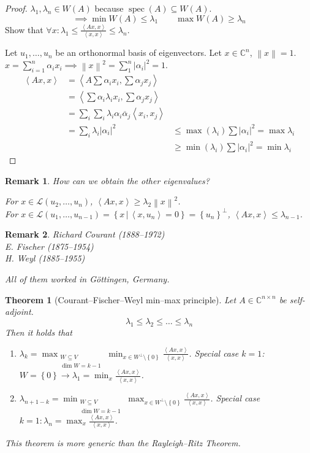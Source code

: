 \documentclass{article}
\newtheorem{theorem}{Theorem}  \numberwithin{theorem}{section}
\newtheorem{remark}{Remark}  \numberwithin{remark}{section}
\newcommand{\set}[1]{\left\{#1\right\}}
\newcommand{\setdef}[2]{\left\{\left.#1\,\right|\,#2\right\}}
\newcommand{\angel}[1]{\left\langle#1\right\rangle}
\newcommand{\norm}[1]{\left\|#1\right\|}
\newcommand{\card}[1]{\left|#1\right|}
\begin{document}
\begin{proof}
  $\lambda_1, \lambda_n \in W(A)$ because $\operatorname{spec}(A) \subseteq W(A)$.
  \[ \implies \min{W(A)} \leq \lambda_1 \qquad \max{W(A)} \geq \lambda_n \]
  Show that $\forall x: \lambda_1 \leq \frac{\angel{Ax, x}}{\angel{x, x}} \leq \lambda_n$.

  Let $u_1, \dots, u_n$ be an orthonormal basis of eigenvectors.
  Let $x \in \mathbb C^n$, $\norm{x} = 1$. $x = \sum_{i=1}^n \alpha_i x_i \implies \norm{x}^2 = \sum_{1}^n \card{\alpha_i}^2 = 1$.
  \begin{align*}
    \angel{Ax, x} &= \angel{A \sum \alpha_i x_i, \sum \alpha_j x_j} \\
      &= \angel{\sum \alpha_i \lambda_i x_i, \sum \alpha_j x_j} \\
      &= \sum_{i} \sum_{i} \lambda_i \alpha_i \overline{\alpha}_j \angel{x_i, x_j} \\
      &= \sum_{i} \lambda_i \card{\alpha_i}^2
      &\leq \max(\lambda_i) \sum \card{\alpha_i}^2 = \max{\lambda_i} \\
      & &\geq \min(\lambda_i) \sum \card{\alpha_i}^2 = \min{\lambda_i}
  \end{align*}
\end{proof}

\begin{remark} %
  How can we obtain the other eigenvalues?

  For $x \in \mathcal L(u_2, \dots, u_n)$, $\angel{Ax, x} \geq \lambda_2 \norm{x}^2$. \\
  For $x \in \mathcal L(u_1, \dots, u_{n-1}) = \setdef{x}{\angel{x, u_n} = 0} = \set{u_n}^\bot$, $\angel{Ax, x} \leq \lambda_{n-1}$.
\end{remark}

\begin{remark}
  Richard Courant (1888--1972) \\
  E. Fischer (1875--1954) \\
  H. Weyl (1885--1955)

  All of them worked in G\"ottingen, Germany.
\end{remark}

\begin{theorem}[Courant--Fischer--Weyl min--max principle] %
  \label{cfw-mm}
  Let $A \in \mathbb C^{n \times n}$ be self-adjoint.
  \[ \lambda_1 \leq \lambda_2 \leq \dots \leq \lambda_n \]
  Then it holds that
  \begin{enumerate}
    \item $\lambda_k = \max_{\substack{W \subseteq V \\ \dim{W} = k - 1}} \min_{x \in W^\bot \setminus \set{0}} \frac{\angel{Ax, x}}{\angel{x, x}}$. Special case $k = 1$: $W = \set{0} \to \lambda_1 = \min_x \frac{\angel{Ax, x}}{\angel{x, x}}$.
    \item $\lambda_{n+1 - k} = \min_{\substack{W \subseteq V \\ \dim{W} = k-1}} \max_{x \in W^\bot \setminus \set{0}} \frac{\angel{Ax, x}}{\angel{x, x}}$. Special case $k = 1: \lambda_n = \max_x \frac{\angel{Ax, x}}{\angel{x, x}}$.
  \end{enumerate}
  This theorem is more generic than the Rayleigh--Ritz Theorem.
\end{theorem}
\end{document}
